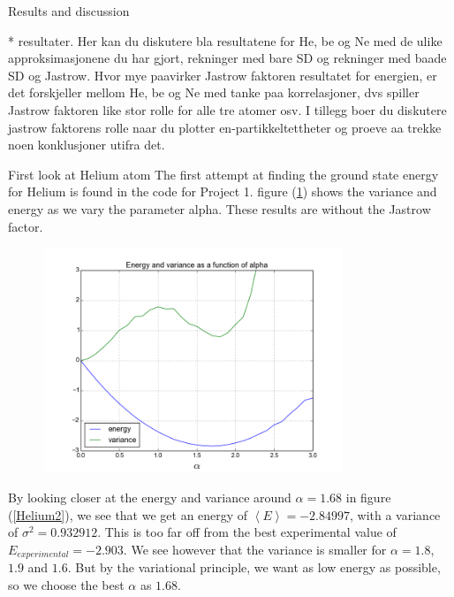 \documentclass[a4paper, 12pt, titlepage]{article}
\begin{document}
\begin{section}{Results and discussion}

* resultater. Her kan du diskutere bla resultatene for He, be og Ne med de ulike approksimasjonene du har gjort, rekninger med bare SD og rekninger med baade SD og Jastrow. Hvor mye paavirker Jastrow faktoren resultatet for energien, er det forskjeller mellom He, be og Ne med tanke paa korrelasjoner, dvs spiller Jastrow faktoren like stor rolle for alle tre atomer osv. I tillegg boer du diskutere jastrow faktorens rolle naar du plotter en-partikkeltettheter og proeve aa trekke noen konklusjoner utifra det.


 \begin{subsection}{First look at Helium atom}
 	The first attempt at finding the ground state energy for Helium is found in the code for Project 1. figure (\ref{Helium1}) shows the variance and energy as we vary the parameter alpha. These results are without the Jastrow factor. 

 \begin{figure}[H]
 	\centering
 	\includegraphics[width=0.8\textwidth]{../python_programs/EnergyVariance_helium1.png}
 	\label{Helium1}
 \end{figure}

 By looking closer at the energy and variance around $\alpha = 1.68$ in figure (\ref{Helium2}), we see that we get an energy of $\left<E\right> = -2.84997$, with a variance of $\sigma ^2 = 0.932912$. This is too far off from the best experimental value of $E_{experimental} = -2.903$. We see however that the variance is smaller for $\alpha = 1.8$, $1.9$ and $1.6$. But by the variational principle, we want as low energy as possible, so we choose the best $\alpha$ as $1.68$. 
 

\end{subsection}
\end{section}
\end{document}
